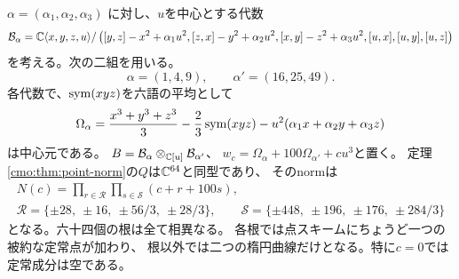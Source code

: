 \begin{example}
\label{cmo:ex:sixty-four}
$\alpha=(\alpha_1,\alpha_2,\alpha_3)$ に対し、$u$を中心とする代数
\[
 \mathcal B_\alpha=\mathbb C\langle x,y,z,u\rangle/
 \left([y,z]-x^2+\alpha_1u^2,
       [z,x]-y^2+\alpha_2u^2,
       [x,y]-z^2+\alpha_3u^2,
       [u,x],[u,y],[u,z]\right)
\]
を考える。次の二組を用いる。
\[
 \alpha=(1,4,9),\qquad \alpha'=(16,25,49).
\]
各代数で、$\operatorname{sym}(xyz)$を六語の平均として
\begin{equation}\label{cmo:eq:mixed-center}
 \Omega_\alpha
 =\frac{x^3+y^3+z^3}{3}-\frac23\operatorname{sym}(xyz)
       -u^2(\alpha_1x+\alpha_2y+\alpha_3z)
\end{equation}
は中心元である。
$B=\mathcal B_\alpha\otimes_{\mathbb C[u]}\mathcal B_{\alpha'}$、
$w_c=\Omega_\alpha+100\Omega_{\alpha'}+cu^3$と置く。
定理\ref{cmo:thm:point-norm}の$Q$は$\mathbb C^{64}$と同型であり、
そのnormは
\begin{equation}\label{cmo:eq:explicit-norm}
 \begin{gathered}
 N(c)=\prod_{r\in\mathcal R}\prod_{s\in\mathcal S}(c+r+100s),\\
 \mathcal R=\{\pm28,\ \pm16,\ \pm56/3,\ \pm28/3\},\qquad
 \mathcal S=\{\pm448,\ \pm196,\ \pm176,\ \pm284/3\}
 \end{gathered}
\end{equation}
となる。六十四個の根は全て相異なる。
各根では点スキームにちょうど一つの被約な定常点が加わり、
根以外では二つの楕円曲線だけとなる。特に$c=0$では定常成分は空である。
\end{example}

